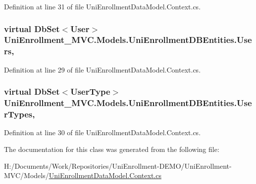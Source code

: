 Definition at line 31 of file Uni\+Enrollment\+Data\+Model.\+Context.\+cs.

\subsubsection[{\texorpdfstring{Users}{Users}}]{\setlength{\rightskip}{0pt plus 5cm}virtual Db\+Set$<${\bf User}$>$ Uni\+Enrollment\+\_\+\+M\+V\+C.\+Models.\+Uni\+Enrollment\+D\+B\+Entities.\+Users\hspace{0.3cm}{\ttfamily [get]}, {\ttfamily [set]}}\hypertarget{class_uni_enrollment___m_v_c_1_1_models_1_1_uni_enrollment_d_b_entities_a440328d8247deb97dd72f9aede6f6ecc}{}\label{class_uni_enrollment___m_v_c_1_1_models_1_1_uni_enrollment_d_b_entities_a440328d8247deb97dd72f9aede6f6ecc}


Definition at line 29 of file Uni\+Enrollment\+Data\+Model.\+Context.\+cs.

\subsubsection[{\texorpdfstring{User\+Types}{UserTypes}}]{\setlength{\rightskip}{0pt plus 5cm}virtual Db\+Set$<${\bf User\+Type}$>$ Uni\+Enrollment\+\_\+\+M\+V\+C.\+Models.\+Uni\+Enrollment\+D\+B\+Entities.\+User\+Types\hspace{0.3cm}{\ttfamily [get]}, {\ttfamily [set]}}\hypertarget{class_uni_enrollment___m_v_c_1_1_models_1_1_uni_enrollment_d_b_entities_ae1554ac52bfff62c2ceb2edc182e8ee6}{}\label{class_uni_enrollment___m_v_c_1_1_models_1_1_uni_enrollment_d_b_entities_ae1554ac52bfff62c2ceb2edc182e8ee6}


Definition at line 30 of file Uni\+Enrollment\+Data\+Model.\+Context.\+cs.



The documentation for this class was generated from the following file\+:\begin{DoxyCompactItemize}
\item 
H\+:/\+Documents/\+Work/\+Repositories/\+Uni\+Enrollment-\/\+D\+E\+M\+O/\+Uni\+Enrollment-\/\+M\+V\+C/\+Models/\hyperlink{_uni_enrollment_data_model_8_context_8cs}{Uni\+Enrollment\+Data\+Model.\+Context.\+cs}\end{DoxyCompactItemize}
